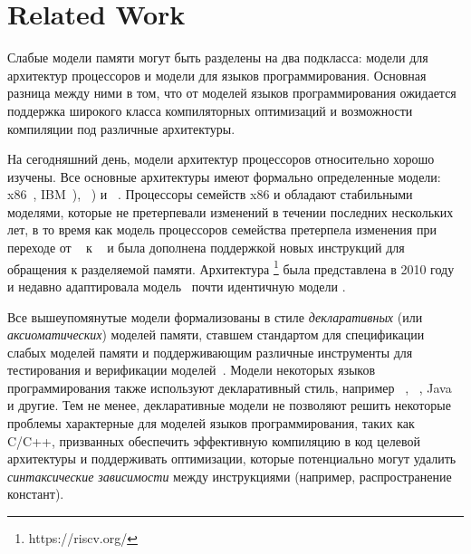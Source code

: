\section{Related Work}
\label{sec:related}

Слабые модели памяти могут быть разделены на два подкласса:
модели для архитектур процессоров и модели для языков программирования.
Основная разница между ними в том, что от моделей языков программирования
ожидается поддержка широкого класса компиляторных оптимизаций и 
возможности компиляции под различные архитектуры. 

На сегодняшний день, модели архитектур процессоров относительно хорошо изучены. 
Все основные архитектуры имеют формально определенные модели:
x86~\cite{Sewell-al:CACM10}, IBM~\POWER \cite{Alglave-DAMP09,Sarkar-al:PLDI11,Alglave-al:TOPLAS14}),
\ARM~\cite{Chong-ASPLOS08, Alglave-DAMP09,Pulte-al:POPL18,Flur-al:POPL16,Alglave-al:TOPLAS14})
и \RISC~\cite{Pulte-al:POPL18}.
Процессоры семейств x86 и \POWER обладают стабильными моделями, 
которые не претерпевали изменений в течении последних нескольких лет, 
в то время как модель процессоров семейства \ARM 
претерпела изменения при переходе от ~\cite{Alglave-al:TOPLAS14} к ~\cite{Pulte-al:POPL18}
и была дополнена поддержкой новых инструкций для обращения к разделяемой памяти.
Архитектура \RISC\footnote{https://riscv.org/} была представлена в 2010 году 
и недавно адаптировала модель~\cite{Pulte-al:POPL18} 
почти идентичную модели .

Все вышеупомянутые модели формализованы в стиле \emph{декларативных} 
(или \emph{аксиоматических}) моделей памяти, 
ставшем стандартом для спецификации слабых моделей памяти и 
поддерживающим различные инструменты для 
тестирования и верификации моделей~\cite{Alglave-al:TOPLAS14}.
Модели некоторых языков программирования также используют декларативный стиль, например
\CPP~\cite{Batty-al:POPL11}, \JS~\cite{Watt-al:PLDI2020}, Java~\cite{Manson-al:POPL05} и другие.
Тем не менее, декларативные модели не позволяют решить некоторые проблемы 
характерные для моделей языков программирования, таких как C/C++, 
призванных обеспечить эффективную компиляцию в код целевой архитектуры и 
поддерживать оптимизации, которые потенциально могут удалить 
\emph{синтаксические зависимости} между инструкциями 
(например, распространение констант). 

